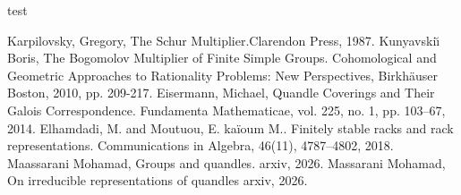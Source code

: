 \documentclass[12pt, reqno]{amsart}
\begin{document}
\begin{thebibliography}{test}

Karpilovsky, Gregory, \newblock The Schur Multiplier.\newblock Clarendon Press, 1987.
Kunyavski{\u{\i}} Boris, \newblock The Bogomolov Multiplier of Finite Simple Groups. \newblock Cohomological and Geometric Approaches to Rationality Problems: New Perspectives, \newblock Birkh{\"a}user Boston, 2010, pp. 209-217.
Eisermann, Michael, \newblock Quandle Coverings and Their Galois Correspondence. \newblock Fundamenta Mathematicae, vol. 225, no. 1, pp. 103–67,  2014.
Elhamdadi, M. and Moutuou, E. kaïoum M.. \newblock Finitely stable racks and rack representations. \newblock  Communications in Algebra, 46(11), 4787–4802, 2018.
Maassarani Mohamad, \newblock Groups and quandles. \newblock arxiv, 2026.
Massarani Mohamad, \newblock On irreducible representations of quandles \newblock arxiv, 2026.
\end{thebibliography}


 


 
\end{document}
